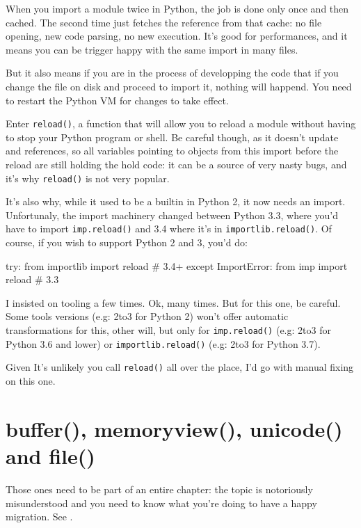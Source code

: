 When you import a module twice in Python, the job is done only once and then cached. The second time just fetches the reference from that cache: no file opening, new code parsing, no new execution. It's good for performances, and it means you can be trigger happy with the same import in many files.

But it also means if you are in the process of developping the code that if you change the file on disk and proceed to import it, nothing will happend. You need to restart the Python VM for changes to take effect.

Enter \lstinline{reload()}, a function that will allow you to reload a module without having to stop your Python program or shell. Be careful though, as it doesn't update and references, so all variables pointing to objects from this import before the reload are still holding the hold code: it can be a source of very nasty bugs, and it's why \lstinline{reload()} is not very popular.

It's also why, while it used to be a builtin in Python 2, it now needs an import. Unfortunaly, the import machinery changed between Python 3.3, where you'd have to import \lstinline{imp.reload()} and 3.4 where it's in \lstinline{importlib.reload()}. Of course, if you wish to support Python 2 and 3, you'd do:

\begin{py2and3}
try:
    from importlib import reload # 3.4+
except ImportError:
    from imp import reload # 3.3
\end{py2and3}

I insisted on tooling a few times. Ok, many times. But for this one, be careful. Some tools versions (e.g: 2to3 for Python 2) won't offer automatic transformations for this, other will, but only for \lstinline{imp.reload()} (e.g: 2to3 for Python 3.6 and lower) or \lstinline{importlib.reload()} (e.g: 2to3 for Python 3.7).

Given It's unlikely you call \lstinline{reload()} all over the place, I'd go with manual fixing on this one.

\section{buffer(), memoryview(), unicode() and file()}

Those ones need to be part of an entire chapter: the topic is notoriously misunderstood and you need to know what you're doing to have a happy migration. See .

